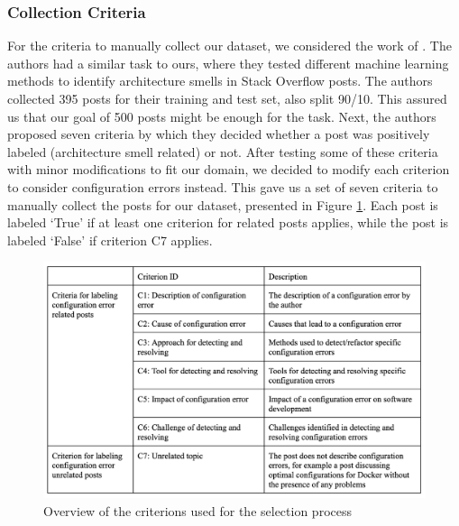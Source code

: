 \documentclass[english,bachelor]{swsLeipzig}
\begin{document}
\subsubsection{Collection Criteria}
For the criteria to manually collect our dataset, we considered the work of \citet{tian:2020}. The authors had a similar 
task to ours, where they tested different machine learning methods to identify architecture smells in Stack Overflow posts. The authors collected 395 posts for their training and test set, also split 90/10. This assured us that our goal of 500 posts might be enough for the task. Next, the authors proposed seven criteria by which they decided whether a post was positively labeled (architecture smell related) or not. After testing some of these criteria with minor modifications to fit our domain, we decided to modify each criterion to consider configuration errors instead. This gave us a set of seven criteria to manually collect the posts for our dataset, presented in Figure \ref{fig:figure499}. Each post is labeled `True' if at least one criterion for related posts applies, while the post is labeled `False' if criterion C7 applies.

\begin{figure}[h]
  \includegraphics[width=1\textwidth]{images/criterions.png}
  \caption{Overview of the criterions used for the selection process}
  \label{fig:figure499}
\end{figure}
\end{document}
